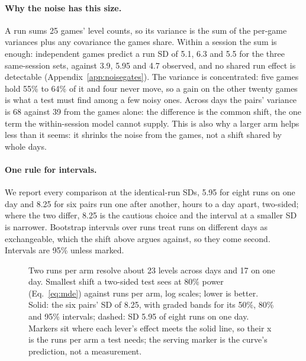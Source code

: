 \paragraph{Why the noise has this size.}
A run sums 25 games' level counts, so its variance is the sum of the per-game variances plus any covariance the games share.
Within a session the sum is enough: independent games predict a run SD of 5.1, 6.3 and 5.5 for the three same-session sets, against 3.9, 5.95 and 4.7 observed, and no shared run effect is detectable (Appendix~\ref{app:noisegates}). %
The variance is concentrated: five games hold 55\% to 64\% of it and four never move, so a gain on the other twenty games is what a test must find among a few noisy ones. %
Across days the pairs' variance is 68 against 39 from the games alone: the difference is the common shift, the one term the within-session model cannot supply. %
This is also why a larger arm helps less than it seems: it shrinks the noise from the games, not a shift shared by whole days.

\paragraph{One rule for intervals.}
We report every comparison at the identical-run SDs, 5.95 for eight runs on one day and 8.25 for six pairs run one after another, hours to a day apart, two-sided; where the two differ, 8.25 is the cautious choice and the interval at a smaller SD is narrower. %
Bootstrap intervals over runs treat runs on different days as exchangeable, which the shift above argues against, so they come second.
Intervals are 95\% unless marked.

\begin{figure}[t]
\centering
{}
\caption{Two runs per arm resolve about 23 levels across days and 17 on one day. Smallest shift a two-sided test sees at 80\% power (Eq.~\ref{eq:mde}) against runs per arm, log scales; lower is better. Solid: the six pairs' SD of 8.25, with graded bands for its 50\%, 80\% and 95\% intervals; dashed: SD 5.95 of eight runs on one day. Markers sit where each lever's effect meets the solid line, so their x is the runs per arm a test needs; the serving marker is the curve's prediction, not a measurement.}\label{fig:power} %
\end{figure}

